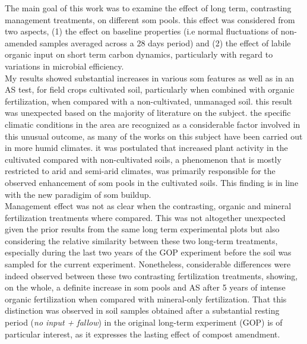 

The  main goal of this work was to examine the effect of long term, contrasting management treatments, on different \gls{som} pools. this effect was considered from two aspects, (1) the effect on baseline properties (i.e normal fluctuations of non-amended samples averaged across a 28 days period) and (2) the effect of labile organic input on short term  carbon dynamics, particularly with regard to variations in microbial efficiency.\\
My results showed substantial increases in various \gls{som} features as well as in an AS test, for field crops cultivated soil, particularly when combined with organic fertilization, when compared with a non-cultivated, unmanaged soil. this result was unexpected based on the majority of literature on the subject. the specific climatic conditions in the area are recognized as a considerable factor involved in this unusual outcome, as many of the works on this subject have been carried out in more humid climates. it was postulated that increased plant activity in the cultivated compared with non-cultivated soils, a phenomenon that is mostly restricted to arid and semi-arid climates, was primarily responsible for the observed enhancement of \gls{som} pools in the cultivated soils. This finding is in line with the new paradigim of \gls{som} buildup. \\
Management effect was not as clear when the contrasting, organic and mineral fertilization treatments where compared. This was not altogether unexpected given the prior results from the same long term experimental plots but also considering the relative similarity between these two long-term treatments, especially during the last two years of the GOP experiment before the soil was sampled for the current experiment. Nonetheless, considerable differences were indeed observed between these two contrasting fertilization treatments, showing, on the whole, a definite increase in \gls{som} pools and AS after 5 years of intense organic fertilization when compared with mineral-only fertilization. That this distinction was observed in soil samples obtained after a substantial resting period (\textit{no input + fallow}) in the original long-term experiment (GOP) is of particular interest, as it expresses the lasting effect of compost amendment.\\
